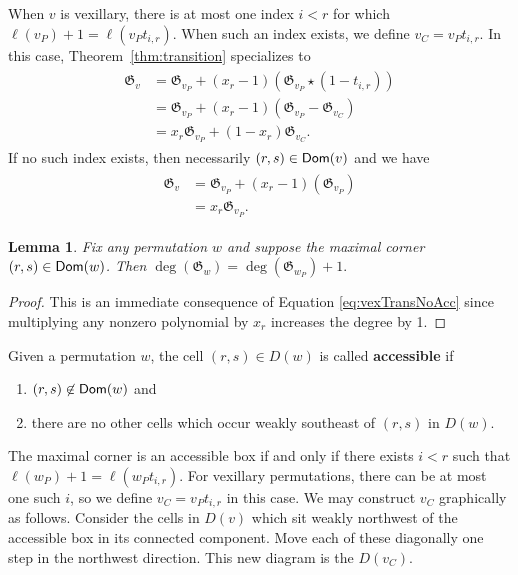 \documentclass[12pt]{amsart}
\newtheorem{lemma}[theorem]{Lemma}
\theoremstyle{definition}
\theoremstyle{remark}
\numberwithin{equation}{section}
\newcommand\mydef[1]{{\bf #1}}
\begin{document}
When $v$ is vexillary, there is at most one index $i<r$ for which $\ell(v_P)+1=\ell(v_Pt_{i,r})$.  When such an index exists, we define $v_C=v_Pt_{i,r}$.  In this case, Theorem~\ref{thm:transition} specializes to 
\begin{align}\label{eq:vexTransAcc}
\begin{split}
\mathfrak G_v&=\mathfrak G_{v_P}+(x_r-1)(\mathfrak G_{v_P}\star(1-t_{i,r})) \\
&=\mathfrak G_{v_P}+(x_r-1)(\mathfrak G_{v_P}-\mathfrak G_{v_C}) \\
&=x_r\mathfrak G_{v_P}+(1-x_r)\mathfrak G_{v_C}.
\end{split}
\end{align}
If no such index exists, then necessarily $(r,s)\in {\sf Dom}(v)$ and we have
\begin{align}\label{eq:vexTransNoAcc}
\begin{split}
\mathfrak G_v&=\mathfrak G_{v_P}+(x_r-1)(\mathfrak G_{v_P})\\
&=x_r\mathfrak G_{v_P}.
\end{split}
\end{align}







\begin{lemma}
\label{lemma:domdeg}
Fix any permutation $w$ and suppose the maximal corner $(r,s)\in {\sf Dom}(w)$. Then $\deg(\mathfrak G_w)=\deg(\mathfrak G_{w_P})+1.$
\end{lemma}	
\begin{proof}
This is an immediate consequence of Equation \eqref{eq:vexTransNoAcc} since multiplying any nonzero polynomial by $x_r$ increases the degree by 1.
\end{proof}


 Given a permutation $w$, the cell $(r,s)\in D(w)$ is called \mydef{accessible} if 
\begin{enumerate}
	\item $(r,s)\not\in {\sf Dom}(w)$ and
	\item there are no other cells which occur weakly southeast of $(r,s)$ in $D(w)$.
\end{enumerate}
The maximal corner is an accessible box if and only if there exists $i<r$ such that $\ell(w_P)+1=\ell(w_Pt_{i,r})$. 
For vexillary permutations, there can be at most one such $i$, so we define $v_C=v_Pt_{i,r}$ in this case.
We may construct $v_C$ graphically as follows. 
Consider the cells in $D(v)$ which sit weakly northwest of the accessible box in its connected component.  Move each of these diagonally one step in the northwest direction.  This new diagram is the $D(v_C)$.
\end{document}
